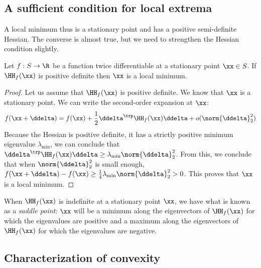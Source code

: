 \subsection{A sufficient condition for local extrema}
A local minimum thus is a stationary point and has a positive
semi-definite Hessian.
The converse is almost true, but we need to strengthen the
Hessian condition slightly.

\begin{theorem}
Let $f:S \rightarrow\R$ be a function twice differentiable at
    a stationary point $\xx\in S$.
     If $\HH_f(\xx)$ is positive definite then $\xx$ is a local minimum.
\end{theorem}

\begin{proof}
    Let us assume that $\HH_f(\xx)$ is positive definite. We know that $\xx$ is a stationary point. We can write the second-order expansion at $\xx$:
    \begin{displaymath}
        f(\xx +\ddelta) = f(\xx) + \frac{1}{2} \ddelta^\trp
        \HH_f(\xx) \ddelta + o( \norm{\ddelta}_2^2)
      \end{displaymath}
    Because the Hessian is positive definite, it has a strictly
    positive minimum eigenvalue $\lambda_{\min}$, we can conclude that
    $\ddelta^\trp \HH_f(\xx) \ddelta \geq \lambda_{\min} \norm{\ddelta}_2^2$.
    From this, we conclude that when $\norm{\ddelta}_2^2$ is small
    enough,
    $f(\xx+\ddelta)-f(\xx) \geq \frac{1}{4} \lambda_{\min}
    \norm{\ddelta}_2^2 > 0$.
   This proves that $\xx$ is a local minimum.
\end{proof}

\begin{remark}
    When $\HH_f(\xx)$ is indefinite at a stationary point $\xx$, we have what is known as a \emph{saddle point}: $\xx$ will be a minimum along the eigenvectors of $\HH_f(\xx)$ for which the eigenvalues are positive and a maximum along the eigenvectors of $\HH_f(\xx)$ for which the eigenvalues are negative.
  \end{remark}

\subsection{Characterization of convexity}

